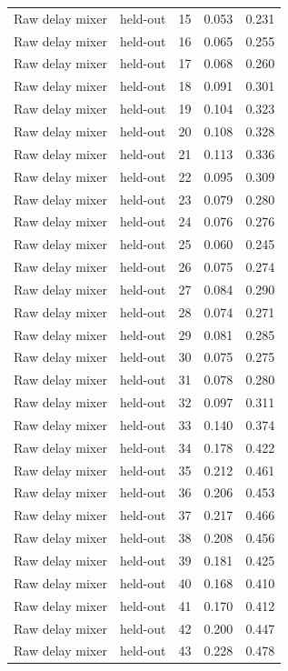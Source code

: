 \begin{tabular}{llrrr}
Raw delay mixer & held-out & 15 & 0.053 & 0.231 \\
Raw delay mixer & held-out & 16 & 0.065 & 0.255 \\
Raw delay mixer & held-out & 17 & 0.068 & 0.260 \\
Raw delay mixer & held-out & 18 & 0.091 & 0.301 \\
Raw delay mixer & held-out & 19 & 0.104 & 0.323 \\
Raw delay mixer & held-out & 20 & 0.108 & 0.328 \\
Raw delay mixer & held-out & 21 & 0.113 & 0.336 \\
Raw delay mixer & held-out & 22 & 0.095 & 0.309 \\
Raw delay mixer & held-out & 23 & 0.079 & 0.280 \\
Raw delay mixer & held-out & 24 & 0.076 & 0.276 \\
Raw delay mixer & held-out & 25 & 0.060 & 0.245 \\
Raw delay mixer & held-out & 26 & 0.075 & 0.274 \\
Raw delay mixer & held-out & 27 & 0.084 & 0.290 \\
Raw delay mixer & held-out & 28 & 0.074 & 0.271 \\
Raw delay mixer & held-out & 29 & 0.081 & 0.285 \\
Raw delay mixer & held-out & 30 & 0.075 & 0.275 \\
Raw delay mixer & held-out & 31 & 0.078 & 0.280 \\
Raw delay mixer & held-out & 32 & 0.097 & 0.311 \\
Raw delay mixer & held-out & 33 & 0.140 & 0.374 \\
Raw delay mixer & held-out & 34 & 0.178 & 0.422 \\
Raw delay mixer & held-out & 35 & 0.212 & 0.461 \\
Raw delay mixer & held-out & 36 & 0.206 & 0.453 \\
Raw delay mixer & held-out & 37 & 0.217 & 0.466 \\
Raw delay mixer & held-out & 38 & 0.208 & 0.456 \\
Raw delay mixer & held-out & 39 & 0.181 & 0.425 \\
Raw delay mixer & held-out & 40 & 0.168 & 0.410 \\
Raw delay mixer & held-out & 41 & 0.170 & 0.412 \\
Raw delay mixer & held-out & 42 & 0.200 & 0.447 \\
Raw delay mixer & held-out & 43 & 0.228 & 0.478 \\

\end{tabular}
